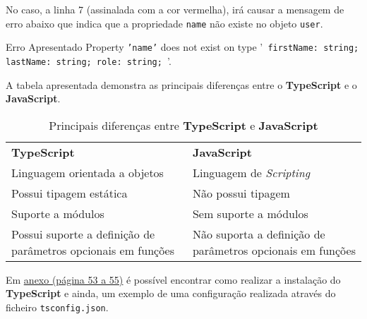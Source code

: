 No caso, a linha 7 (assinalada com a cor vermelha), irá causar a mensagem de erro abaixo que indica que a propriedade \texttt{name} não existe no objeto \texttt{user}.

\begin{errorbox}{Erro Apresentado}
	Property \texttt{'name'} does not exist on type '\texttt{{ firstName: string; lastName: string; role: string; }}'.
\end{errorbox}

A tabela apresentada demonstra as principais diferenças entre o \textbf{TypeScript} e o \textbf{JavaScript}.

\begin{table}[h!]
	\renewcommand{\arraystretch}{1.25}
	\begin{tabularx}{\textwidth}{ |X|X| }
		\rowcolor{estg}	{\color[HTML]{FFFFFF} \textbf{TypeScript}} & {\color[HTML]{FFFFFF} \textbf{JavaScript}} \\
		Linguagem orientada a objetos & Linguagem de \textit{Scripting} \\\hline
		Possui tipagem estática & Não possui tipagem \\\hline
		Suporte a módulos & Sem suporte a módulos\\\hline
		Possui suporte a definição de parâmetros opcionais em funções & Não suporta a definição de parâmetros opcionais em funções \\\hline
	\end{tabularx}

	\caption{Principais diferenças entre \textbf{TypeScript} e \textbf{JavaScript}}
\end{table}

Em \underline{\hyperref[typescriptAttachment]{anexo {\footnotesize(página 53 a 55)}}} é possível encontrar como realizar a instalação do \textbf{TypeScript} e ainda, um exemplo de uma configuração realizada através do ficheiro \texttt{tsconfig.json}.
